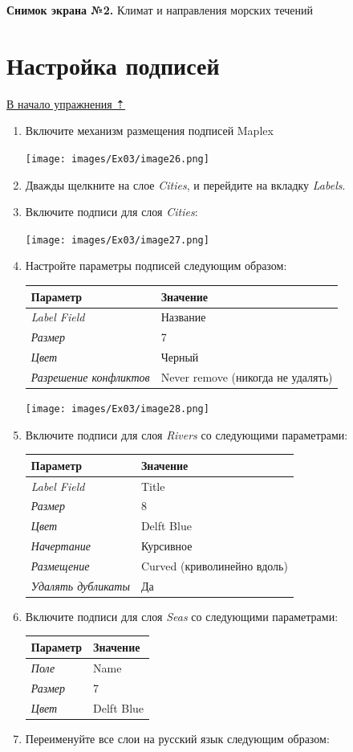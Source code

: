 \documentclass[12pt,]{book}
\begin{document}
\textbf{Снимок экрана №2.} Климат и направления морских течений

\hypertarget{map-design-climates-labels}{%
\section{Настройка подписей}\label{map-design-climates-labels}}

\protect\hyperlink{map-design-climates}{В начало упражнения ⇡}

\begin{enumerate}
\def\labelenumi{\arabic{enumi}.}
\item
  Включите механизм размещения подписей Maplex

  \texttt{[image: images/Ex03/image26.png]}
\item
  Дважды щелкните на слое \emph{Cities}, и перейдите на вкладку \emph{Labels}.
\item
  Включите подписи для слоя \emph{Cities}:

  \texttt{[image: images/Ex03/image27.png]}
\item
  Настройте параметры подписей следующим образом:

  \begin{longtable}[]{@{}ll@{}}
  \toprule
  \textbf{Параметр} & \textbf{Значение}\tabularnewline
  \midrule
  \endhead
  \emph{Label Field} & Название\tabularnewline
  \emph{Размер} & 7\tabularnewline
  \emph{Цвет} & Черный\tabularnewline
  \emph{Разрешение конфликтов} & Never remove (никогда не удалять)\tabularnewline
  \bottomrule
  \end{longtable}

  \texttt{[image: images/Ex03/image28.png]}
\item
  Включите подписи для слоя \emph{Rivers} со следующими параметрами:

  \begin{longtable}[]{@{}ll@{}}
  \toprule
  \textbf{Параметр} & \textbf{Значение}\tabularnewline
  \midrule
  \endhead
  \emph{Label Field} & Title\tabularnewline
  \emph{Размер} & 8\tabularnewline
  \emph{Цвет} & Delft Blue\tabularnewline
  \emph{Начертание} & Курсивное\tabularnewline
  \emph{Размещение} & Curved (криволинейно вдоль)\tabularnewline
  \emph{Удалять дубликаты} & Да\tabularnewline
  \bottomrule
  \end{longtable}
\item
  Включите подписи для слоя \emph{Seas} со следующими параметрами:

  \begin{longtable}[]{@{}ll@{}}
  \toprule
  \textbf{Параметр} & \textbf{Значение}\tabularnewline
  \midrule
  \endhead
  \emph{Поле} & Name\tabularnewline
  \emph{Размер} & 7\tabularnewline
  \emph{Цвет} & Delft Blue\tabularnewline
  \bottomrule
  \end{longtable}
\item
  Переименуйте все слои на русский язык следующим образом:


\end{enumerate}
\end{document}

